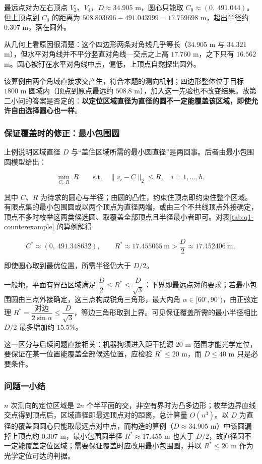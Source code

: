 最远点对为左右顶点 $V_2$、$V_4$，$D\approx 34.905$ m，圆心只能取 $C_0\approx(0,\ 491.044)$。但上顶点到 $C_0$ 的距离为 $508.803696-491.043999=17.759698$ m，超出半径约 $0.307$ m，落在圆外。

从几何上看原因很清楚：这个四边形两条对角线几乎等长（$34.905$ m 与 $34.321$ m），但水平对角线并不平分竖直对角线---交点之上高 $17.760$ m，之下只有 $16.562$ m。圆心被钉在水平对角线中点，偏低，上顶点自然探出圆外。

该算例由两个角域直接求交产生，符合本题的测向机制；四边形整体位于目标 $1800$ m 圆域内（顶点到原点最远约 $508.8$ m），加入这一先验也不改变结果。故第二小问的答案是否定的：\textbf{以定位区域直径为直径的圆不一定能覆盖该区域，即使允许自由选择圆心也一样}。

\subsubsection{保证覆盖时的修正：最小包围圆}\label{sec:q1-4}
上例说明区域直径 $D$ 与“盖住区域所需的最小圆直径”是两回事。后者由最小包围圆模型给出：

\begin{equation}\label{eq:q1-7}
\min_{C,\ R}\ R
\qquad\text{s.t.}\quad\|v_i-C\|_2\le R,\quad i=1,\dots,h,
\end{equation}

其中 $C$、$R$ 为待求的圆心与半径；由圆的凸性，约束住顶点即约束住整个区域。有限点集的最小包围圆或以两个顶点为直径两端，或由三个不共线顶点外接确定，顶点不多时枚举这两类候选圆、取覆盖全部顶点且半径最小者即可。对表\ref{tab:q1-counterexample} 的算例解得

\[
C^*\approx(0,\ 491.348632),\qquad
R^*\approx 17.455065\ \text{m}>\frac D2\approx 17.452406\ \text{m},
\]

即使圆心取到最优位置，所需半径仍大于 $D/2$。

一般地，平面有界凸区域满足 $\dfrac D2\le R^*\le\dfrac{D}{\sqrt 3}$：下界即最远点对的要求；若最小包围圆由三点外接确定，这三点构成锐角三角形，最大内角 $\alpha\in[60^\circ,90^\circ)$，由正弦定理 $R^*=\dfrac{\text{对边}}{2\sin\alpha}\le\dfrac{D}{\sqrt 3}$，等边三角形取到上界。可见保证覆盖所需的最小半径相比 $D/2$ 最多增加约 $15.5\%$。

这一区分与后续问题直接相关：机器狗须进入距干扰源 $20$ m 范围才能光学定位，要保证在某一位置能覆盖全部候选位置，应检验 $R^*\le 20$ m，而 $D\le 40$ m 只是必要条件。

\subsubsection{问题一小结}\label{sec:q1-5}
$n$ 次测向的定位区域是 $2n$ 个半平面的交，非空有界时为凸多边形；枚举边界直线交点得到顶点后，区域直径即最远顶点对的距离，总计算量 $O(n^3)$。以 $D$ 为直径的覆盖圆圆心只能取最远点对中点，而构造的算例（$D\approx 34.905$ m）中该圆漏掉上顶点约 $0.307$ m，最小包围圆半径 $R^*\approx 17.455$ m 也大于 $D/2$，故直径圆不一定能覆盖定位区域；需要保证覆盖时应改用最小包围圆，并以 $R^*\le 20$ m 作为光学定位可达的判据。
